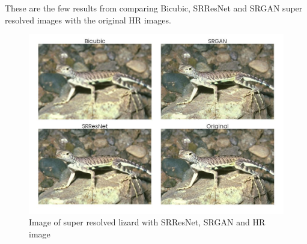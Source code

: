 \clearpage
\newpage
    These are the few results from comparing Bicubic, SRResNet and SRGAN super resolved images with the original HR images.
    \begin{figure}[t]
        \centering
        \includegraphics[width=5.5in]{./figures/examples/lizard.jpg}
        \caption{Image of super resolved lizard with SRResNet, SRGAN and HR image}
    \end{figure}
